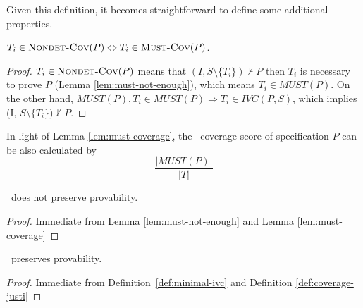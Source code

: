 %

\noindent Given this definition, it becomes straightforward to define some additional properties.

\begin{lemma}
  \label{lem:must-coverage}
$T_i \in \text{\sc Nondet-Cov} (P) \Leftrightarrow T_i \in \text{\sc Must-Cov}(P)$.
\end{lemma}
\begin{proof}
$T_i \in \text{\sc Nondet-Cov} (P)$ means that $(I, S \setminus \{ T_i \}) \nvdash P$ then $T_i$ is necessary to prove $P$ (Lemma \ref{lem:must-not-enough}), which means $T_i \in MUST(P)$.
On the other hand, $MUST(P), T_i \in MUST (P) \Rightarrow T_i \in IVC(P, S)$,
which implies (I, $S \setminus \{ T_i \}) \nvdash P$.
\end{proof}
\vspace{2mm}

In light of Lemma \ref{lem:must-coverage}, the \nondetcov\ coverage score of specification $P$ can be also calculated by
$$\frac{|MUST(P)|}{|T|}$$
\vspace{0.2in}


%
\begin{coroll}
\label{cor:must-not-provable}
\nondetcov\ does not preserve provability.
\end{coroll}
\begin{proof}
Immediate from Lemma \ref{lem:must-not-enough} and Lemma \ref{lem:must-coverage}
\end{proof}
\vspace{2mm}
\begin{coroll}
\label{cor:ivc-provable}
\ivccov\ preserves provability.
\end{coroll}
\begin{proof}
Immediate from Definition~\ref{def:minimal-ivc} and Definition \ref{def:coverage-justi}
\end{proof}
\vspace{2mm}

